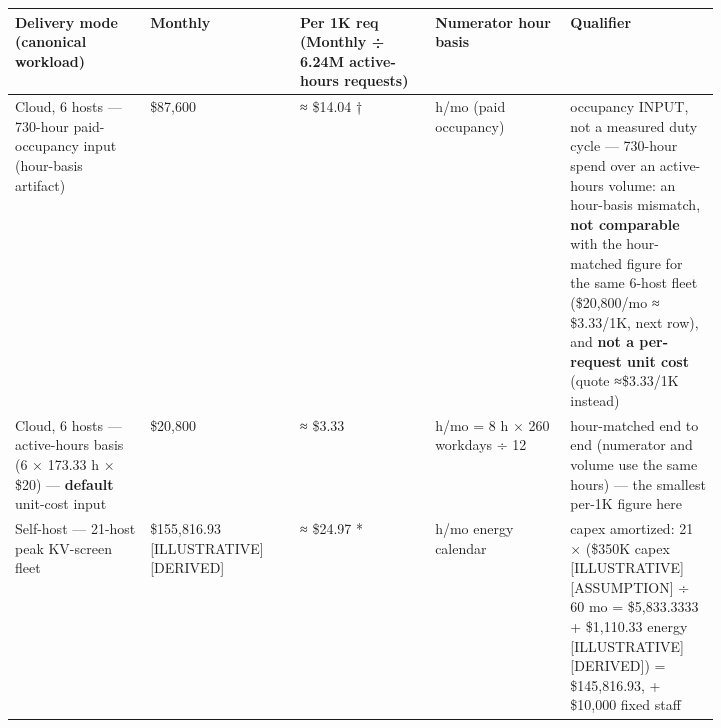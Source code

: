 \nopagebreak[4]
\begin{longtable}[]{@{}
  >{\raggedright\arraybackslash}p{0.1647\linewidth}
  >{\raggedright\arraybackslash}p{0.1647\linewidth}
  >{\raggedright\arraybackslash}p{0.1647\linewidth}
  >{\raggedright\arraybackslash}p{0.1647\linewidth}
  >{\raggedright\arraybackslash}p{0.1647\linewidth}@{}}
\toprule\noalign{}
\begin{minipage}[b]{\linewidth}\raggedright
Delivery mode (canonical workload)
\end{minipage} & \begin{minipage}[b]{\linewidth}\raggedright
Monthly
\end{minipage} & \begin{minipage}[b]{\linewidth}\raggedright
Per 1K req (Monthly ÷ 6.24M active-hours requests)
\end{minipage} & \begin{minipage}[b]{\linewidth}\raggedright
Numerator hour basis
\end{minipage} & \begin{minipage}[b]{\linewidth}\raggedright
Qualifier
\end{minipage} \\
\midrule\noalign{}
\endhead
\bottomrule\noalign{}
\endlastfoot
Cloud, 6 hosts --- 730-hour paid-occupancy input (hour-basis artifact) &
\$87,600 & ≈ \$14.04 † & 730 h/mo (paid occupancy) & occupancy INPUT,
not a measured duty cycle --- 730-hour spend over an active-hours
volume: an hour-basis mismatch, \textbf{not comparable} with the
hour-matched figure for the same 6-host fleet (\$20,800/mo ≈ \$3.33/1K,
next row), and \textbf{not a per-request unit cost} (quote ≈\$3.33/1K
instead) \\
\noalign{\label{tab:4.4}}
Cloud, 6 hosts --- active-hours basis (6 × 173.33 h × \$20) ---
\textbf{default} unit-cost input & \$20,800 & ≈ \$3.33 & 173.33 h/mo = 8
h × 260 workdays ÷ 12 & hour-matched end to end (numerator and volume
use the same hours) --- the smallest per-1K figure here \\
Self-host --- 21-host peak KV-screen fleet & \$155,816.93
\mbox{{[}ILLUSTRATIVE{]}}\hspace{0pt}\mbox{{[}DERIVED{]}} & ≈ \$24.97 * & 730 h/mo energy calendar
& capex amortized: 21 × (\$350K capex \mbox{{[}ILLUSTRATIVE{]}}\hspace{0pt}\mbox{{[}ASSUMPTION{]}}
÷ 60 mo = \$5,833.3333 + \$1,110.33 energy
\mbox{{[}ILLUSTRATIVE{]}}\hspace{0pt}\mbox{{[}DERIVED{]}}) = \$145,816.93, + \$10,000 fixed staff

\end{longtable}
